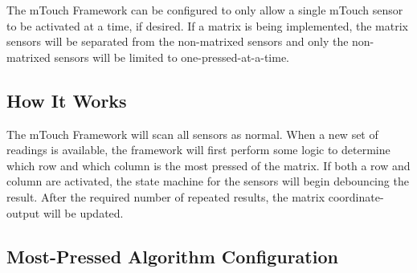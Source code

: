 The m\+Touch Framework can be configured to only allow a single m\+Touch sensor to be activated at a time, if desired. If a matrix is being implemented, the matrix sensors will be separated from the non-\/matrixed sensors and only the non-\/matrixed sensors will be limited to one-\/pressed-\/at-\/a-\/time.\hypertarget{feat_most_pressed_featMostPressed-How}{}\subsection{How It Works}\label{feat_most_pressed_featMostPressed-How}
The m\+Touch Framework will scan all sensors as normal. When a new set of readings is available, the framework will first perform some logic to determine which row and which column is the most pressed of the matrix. If both a row and column are activated, the state machine for the sensors will begin debouncing the result. After the required number of repeated results, the matrix coordinate-\/output will be updated.\hypertarget{feat_most_pressed_featMostPressed-Config}{}\subsection{Most-\/\+Pressed Algorithm Configuration}\label{feat_most_pressed_featMostPressed-Config}

